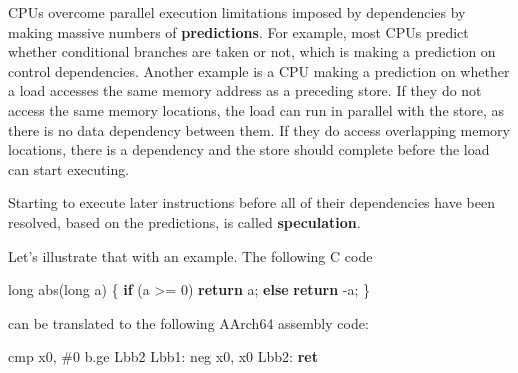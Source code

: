 \documentclass[
  a4paper,
]{report}
\newenvironment{Shaded}{}{}
\newcommand{\BuiltInTok}[1]{\textcolor[rgb]{0.00,0.50,0.00}{#1}}
\newcommand{\ControlFlowTok}[1]{\textcolor[rgb]{0.00,0.44,0.13}{\textbf{#1}}}
\newcommand{\DataTypeTok}[1]{\textcolor[rgb]{0.56,0.13,0.00}{#1}}
\newcommand{\DecValTok}[1]{\textcolor[rgb]{0.25,0.63,0.44}{#1}}
\newcommand{\FunctionTok}[1]{\textcolor[rgb]{0.02,0.16,0.49}{#1}}
\newcommand{\NormalTok}[1]{#1}
\newcommand{\OperatorTok}[1]{\textcolor[rgb]{0.40,0.40,0.40}{#1}}
\begin{document}
CPUs overcome parallel execution limitations imposed by dependencies by
making massive numbers of \textbf{predictions}. For
example, most CPUs predict whether conditional branches are taken or
not, which is making a prediction on control dependencies. Another
example is a CPU making a prediction on whether a load accesses the same
memory address as a preceding store. If they do not access the same
memory locations, the load can run in parallel with the store, as there
is no data dependency between them. If they do access overlapping memory
locations, there is a dependency and the store should complete before
the load can start executing.

Starting to execute later instructions before all of their dependencies
have been resolved, based on the predictions, is called
\textbf{speculation}.

Let's illustrate that with an example. The following C code

\begin{Shaded}
\begin{Highlighting}[]
\DataTypeTok{long}\NormalTok{ abs}\OperatorTok{(}\DataTypeTok{long}\NormalTok{ a}\OperatorTok{)} \OperatorTok{\{}
  \ControlFlowTok{if} \OperatorTok{(}\NormalTok{a }\OperatorTok{\textgreater{}=} \DecValTok{0}\OperatorTok{)}
    \ControlFlowTok{return}\NormalTok{ a}\OperatorTok{;}
  \ControlFlowTok{else}
    \ControlFlowTok{return} \OperatorTok{{-}}\NormalTok{a}\OperatorTok{;}
\OperatorTok{\}}
\end{Highlighting}
\end{Shaded}

can be translated to the following AArch64 assembly code:

\begin{Shaded}
\begin{Highlighting}[]
        \BuiltInTok{cmp}\NormalTok{     x0}\OperatorTok{,} \OperatorTok{\#}\DecValTok{0}
\NormalTok{        b}\OperatorTok{.}\NormalTok{ge    Lbb2}
\FunctionTok{Lbb1:}
        \BuiltInTok{neg}\NormalTok{     x0}\OperatorTok{,}\NormalTok{ x0}
\FunctionTok{Lbb2:}
        \ControlFlowTok{ret}
\end{Highlighting}
\end{Shaded}
\end{document}
